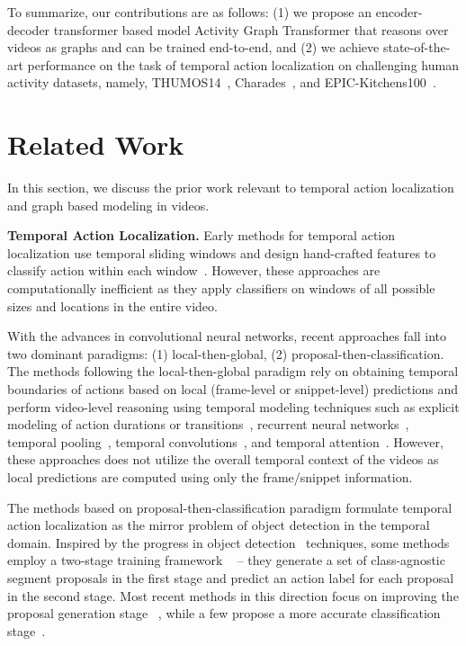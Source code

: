 \documentclass[10pt,twocolumn,letterpaper]{article}
\begin{document}
To summarize, our contributions are as follows: (1) we propose an encoder-decoder transformer based model Activity Graph Transformer that reasons over videos as graphs and can be trained end-to-end, and (2) we achieve state-of-the-art performance on the task of temporal action localization on challenging human activity datasets, namely, THUMOS14~\cite{THUMOS14}, Charades~\cite{sigurdsson2016hollywood}, and EPIC-Kitchens100~\cite{Damen2020RESCALING}. 



 
\section{Related Work}
\noindent
In this section, we discuss the prior work relevant to temporal action localization and graph based modeling in videos.

\vspace{0.05in}
\noindent
\textbf{Temporal Action Localization.} Early methods for temporal action localization use temporal sliding windows and design hand-crafted features to classify action within each window~\cite{yuan2016temporal,gaidon2013temporal,jain2014action,tang2013combining,oneata2013action}. However, these approaches are computationally inefficient as they apply classifiers on windows of all possible sizes and locations in the entire video. 

With the advances in convolutional neural networks, recent approaches fall into two dominant paradigms: (1) local-then-global, (2) proposal-then-classification. The methods following the local-then-global paradigm rely on obtaining temporal boundaries of actions based on local (\ie frame-level or snippet-level) predictions and perform video-level reasoning using temporal modeling techniques such as explicit modeling of action durations or transitions~\cite{richard2016temporal,yuan2017temporal}, recurrent neural networks~\cite{dave2017predictive, singh2016multi, ma2016learning, yeung2016end}, temporal pooling~\cite{karpathy2014large}, temporal convolutions~\cite{lea2017temporal,piergiovanni2018learning}, and temporal attention~\cite{piergiovanni2018learning}. However, these approaches does not utilize the overall temporal context of the videos as local predictions are computed using only the frame/snippet information.

The methods based on proposal-then-classification paradigm formulate temporal action localization as the mirror problem of object detection in the temporal domain. Inspired by the progress in object detection~\cite{girshick2015fast} techniques, some methods employ a two-stage training framework ~\cite{caba2016fast,buch2017sst,heilbron2017scc,escorcia2016daps,shou2016temporal,shou2017cdc,zhao2017temporal,zhao2020bottom} -- they generate a set of class-agnostic segment proposals in the first stage and predict an action label for each proposal in the second stage. Most recent methods in this direction focus on improving the proposal generation stage ~\cite{caba2016fast,buch2017sst,heilbron2017scc,escorcia2016daps,lin2019bmn,lin2018bsn,zhao2020bottom,bai2020boundary}, while a few propose a more accurate classification stage~\cite{shou2017cdc,zhao2017temporal}. 
\end{document}
